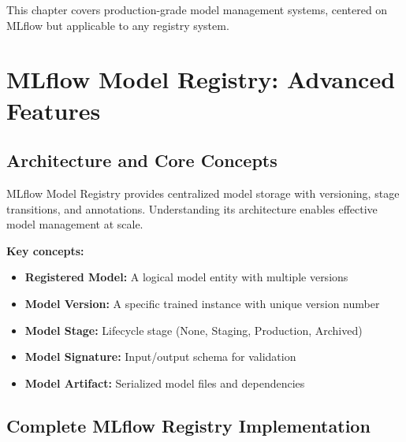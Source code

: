 This chapter covers production-grade model management systems, centered on MLflow but applicable to any registry system.

\section{MLflow Model Registry: Advanced Features}

\subsection{Architecture and Core Concepts}

MLflow Model Registry provides centralized model storage with versioning, stage transitions, and annotations. Understanding its architecture enables effective model management at scale.

\textbf{Key concepts:}
\begin{itemize}
    \item \textbf{Registered Model:} A logical model entity with multiple versions
    \item \textbf{Model Version:} A specific trained instance with unique version number
    \item \textbf{Model Stage:} Lifecycle stage (None, Staging, Production, Archived)
    \item \textbf{Model Signature:} Input/output schema for validation
    \item \textbf{Model Artifact:} Serialized model files and dependencies
\end{itemize}

\subsection{Complete MLflow Registry Implementation}

